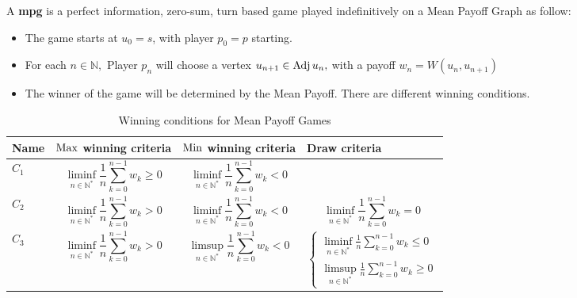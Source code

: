A  \textbf{\acrfull{mpg}} is a perfect information, zero-sum, turn based game played indefinitively on a Mean Payoff Graph as follow:
\begin{itemize}
\item The game starts at $u_0=s$, with player $p_0=p$ starting.
\item For each $n\in\mathbb{N},$ Player $p_n$ will choose a vertex $u_{n+1}\in \operatorname{Adj} u_n,$ with a payoff $w_n=W(u_n,u_{n+1})$
\item The winner of the game will be determined by the Mean Payoff. There are different winning conditions.
\end{itemize}

\begin{table}[h]
	\small
	\begin{tabularx}{\textwidth}{| p{2cm} | X | X | X |}
		\hline
		
		Name & $\operatorname{Max}$ winning criteria & $\operatorname{Min}$ winning criteria & Draw criteria  \\
		\hline
		$C_1$ & \begin{equation*}
			\liminf_{n\in\mathbb{N}^*} \frac{1}{n}\sum_{k=0}^{n-1} w_k \ge 0
		\end{equation*} & \begin{equation*}
		\liminf_{n\in\mathbb{N}^*} \frac{1}{n}\sum_{k=0}^{n-1} w_k < 0
		\end{equation*} & \cellcolor{gray!75} \\
		\hline
		$C_2$ & \begin{equation*}
			\liminf_{n\in\mathbb{N}^*} \frac{1}{n}\sum_{k=0}^{n-1} w_k > 0
		\end{equation*} & \begin{equation*}
			\liminf_{n\in\mathbb{N}^*} \frac{1}{n}\sum_{k=0}^{n-1} w_k < 0
		\end{equation*} & \begin{equation*}
		\liminf_{n\in\mathbb{N}^*} \frac{1}{n}\sum_{k=0}^{n-1} w_k = 0
		\end{equation*} \\
		\hline
		 $C_3$ & \begin{equation*}
		 	\liminf_{n\in\mathbb{N}^*} \frac{1}{n}\sum_{k=0}^{n-1} w_k > 0
		 \end{equation*} & \begin{equation*}
		 	\limsup_{n\in\mathbb{N}^*} \frac{1}{n}\sum_{k=0}^{n-1} w_k < 0
		 \end{equation*} & \begin{equation*}
		 \begin{cases} 
		 	\displaystyle \liminf_{n\in\mathbb{N}^*} \frac{1}{n}\sum_{k=0}^{n-1} w_k \le 0 \\
		 	 \displaystyle \limsup_{n\in\mathbb{N}^*} \frac{1}{n}\sum_{k=0}^{n-1} w_k \ge 0
		 \end{cases}
		 \end{equation*}\\
		\hline
	\end{tabularx}
	\caption{Winning conditions for Mean Payoff Games
		\label{table:WinningConditions}}
\end{table}
